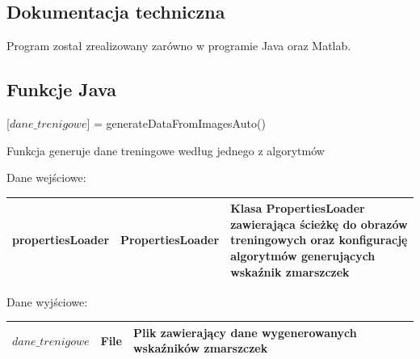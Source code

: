 \documentclass[a4paper,twoside,12pt]{book}
\newcounter{stronyPozaNumeracja}
\begin{document}
    \backmatter
    \setcounter{page}{\value{stronyPozaNumeracja}}

    \pagestyle{tylkoNumeryStron}

    
    


    \begin{appendices}


        \chapter*{Dokumentacja techniczna}
        Program został zrealizowany zarówno w programie Java oraz Matlab.

        \section*{Funkcje Java}

        [$dane\_trenigowe$] = generateDataFromImagesAuto()

        \bigskip
        Funkcja generuje dane treningowe według jednego z algorytmów

        \bigskip
        Dane wejściowe:
        \begin{table}[h!]
            \centering
            \begin{tabular}{|p{4cm}|p{4cm}|p{4cm}|}
                \hline
                propertiesLoader & PropertiesLoader
                & Klasa PropertiesLoader zawierająca ścieżkę do obrazów
                treningowych oraz konfigurację algorytmów generujących wskaźnik zmarszczek \\ \hline
            \end{tabular}
        \end{table}

        Dane wyjściowe:
        \begin{table}[h!]
            \centering
            \begin{tabular}{|p{4cm}|p{4cm}|p{4cm}|}
                \hline
                $dane\_trenigowe$ & File & Plik zawierający dane wygenerowanych wskaźników zmarszczek\\ \hline
            \end{tabular}
        \end{table}


\end{appendices}
\end{document}
